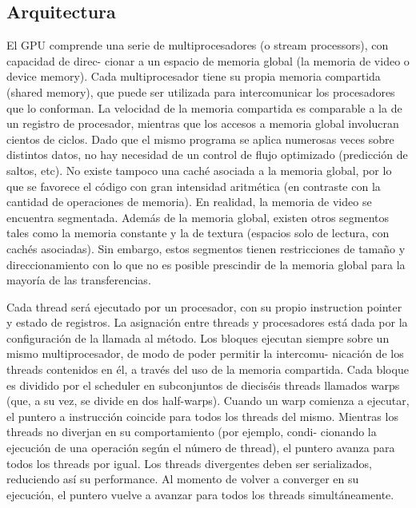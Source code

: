 \documentclass[a4paper,10pt]{report}
\begin{document}
\subsection{Arquitectura}

El GPU comprende una serie de multiprocesadores (o stream processors), con capacidad de direc-
cionar a un espacio de memoria global (la memoria de video o device memory). Cada multiprocesador
tiene su propia memoria compartida (shared memory), que puede ser utilizada para intercomunicar los
procesadores que lo conforman.
La velocidad de la memoria compartida es comparable a la de un registro de procesador, mientras
que los accesos a memoria global involucran cientos de ciclos. Dado que el mismo programa se aplica
numerosas veces sobre distintos datos, no hay necesidad de un control de flujo optimizado (predicción
de saltos, etc). No existe tampoco una caché asociada a la memoria global, por lo que se favorece el
código con gran intensidad aritmética (en contraste con la cantidad de operaciones de memoria).
En realidad, la memoria de video se encuentra segmentada. Además de la memoria global, existen
otros segmentos tales como la memoria constante y la de textura (espacios solo de lectura, con cachés
asociadas). Sin embargo, estos segmentos tienen restricciones de tamaño y direccionamiento con lo que
no es posible prescindir de la memoria global para la mayoría de las transferencias.

Cada thread será ejecutado por un procesador, con su propio instruction pointer y estado de registros.
La asignación entre threads y procesadores está dada por la configuración de la llamada al método. Los
bloques ejecutan siempre sobre un mismo multiprocesador, de modo de poder permitir la intercomu-
nicación de los threads contenidos en él, a través del uso de la memoria compartida. Cada bloque es
dividido por el scheduler en subconjuntos de dieciséis threads llamados warps (que, a su vez, se divide
en dos half-warps). Cuando un warp comienza a ejecutar, el puntero a instrucción coincide para todos
los threads del mismo. Mientras los threads no diverjan en su comportamiento (por ejemplo, condi-
cionando la ejecución de una operación según el número de thread), el puntero avanza para todos los
threads por igual. Los threads divergentes deben ser serializados, reduciendo así su performance. Al
momento de volver a converger en su ejecución, el puntero vuelve a avanzar para todos los threads
simultáneamente.
\end{document}
